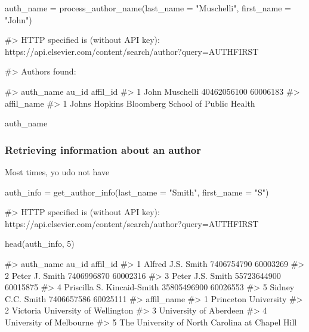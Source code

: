 \begin{Schunk}
\begin{Sinput}
auth_name = process_author_name(last_name = "Muschelli", first_name = "John")
\end{Sinput}
\begin{Soutput}
#> HTTP specified is (without API key): https://api.elsevier.com/content/search/author?query=AUTHFIRST%
\end{Soutput}
\begin{Soutput}
#> Authors found:
\end{Soutput}
\begin{Soutput}
#>        auth_name       au_id affil_id
#> 1 John Muschelli 40462056100 60006183
#>                                        affil_name
#> 1 Johns Hopkins Bloomberg School of Public Health
\end{Soutput}
\begin{Sinput}
auth_name
\end{Sinput}
\end{Schunk}

\hypertarget{retrieving-information-about-an-author}{%
\subsubsection{Retrieving information about an
author}\label{retrieving-information-about-an-author}}

Most times, yo udo not have

\begin{Schunk}
\begin{Sinput}
auth_info = get_author_info(last_name = "Smith", first_name = "S")
\end{Sinput}
\begin{Soutput}
#> HTTP specified is (without API key): https://api.elsevier.com/content/search/author?query=AUTHFIRST%
\end{Soutput}
\begin{Sinput}
head(auth_info, 5)
\end{Sinput}
\begin{Soutput}
#>                    auth_name       au_id affil_id
#> 1          Alfred J.S. Smith  7406754790 60003269
#> 2             Peter J. Smith  7406996870 60002316
#> 3           Peter J.S. Smith 55723644900 60015875
#> 4 Priscilla S. Kincaid-Smith 35805496900 60026553
#> 5          Sidney C.C. Smith  7406657586 60025111
#>                                        affil_name
#> 1                            Princeton University
#> 2               Victoria University of Wellington
#> 3                          University of Aberdeen
#> 4                         University of Melbourne
#> 5 The University of North Carolina at Chapel Hill
\end{Soutput}
\end{Schunk}

